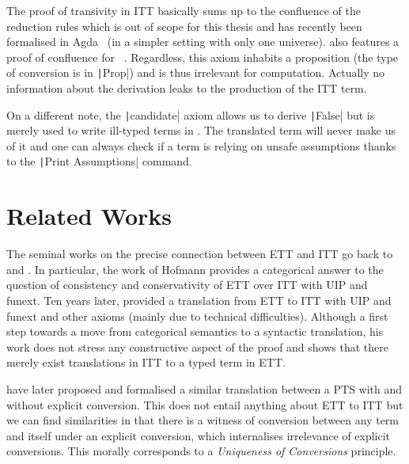 The proof of transivity in \acrshort{ITT} basically sums up to the confluence of
the reduction rules which is out of scope for this thesis and has
recently been formalised in Agda~ (in a
simpler setting with only one universe).
\MetaCoq also features a proof of confluence for
\Coq~.
Regardless, this axiom inhabits a proposition (the type of conversion is in
\texttt|Prop|) and is thus irrelevant for computation. Actually no
information about the derivation leaks to the production of the \acrshort{ITT}
term.

On a different note, the \texttt|candidate| axiom allows us to derive
\texttt|False| but is merely used to write ill-typed terms in \Coq.
The translated term will never make us of it and one can always check if a
term is relying on unsafe assumptions thanks to the
\texttt|Print Assumptions| command.

\section{Related Works}
\label{sec:related-works}

The seminal works on the precise connection between \acrshort{ETT} and
\acrshort{ITT} go back to  and
.
%
In particular, the work of Hofmann provides a categorical answer to
the question of consistency and conservativity of \acrshort{ETT} over
\acrshort{ITT} with \acrshort{UIP} and \acrshort{funext}.
%
Ten years later,  provided
a translation from \acrshort{ETT} to \acrshort{ITT} with
\acrshort{UIP} and \acrshort{funext} and other axioms (mainly due to
technical difficulties).
%
Although a first step towards a move from categorical semantics to a
syntactic translation, his work does not stress any constructive
aspect of the proof and shows that there merely exist translations in
\acrshort{ITT} to a typed term in \acrshort{ETT}.

 have later proposed and
formalised a similar translation between a \acrshort{PTS} with and without
explicit conversion. This does not entail anything about \acrshort{ETT} to
\acrshort{ITT} but we can find similarities in that there is a witness of
conversion between any term and itself under an explicit conversion, which
internalises irrelevance of explicit conversions. This morally corresponds to a
\emph{Uniqueness of Conversions} principle.

